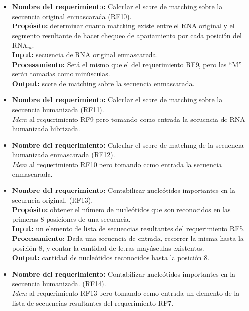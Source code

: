 \documentclass[12pt,a4paper,spanish]{article}
\begin{document}
\begin{itemize}
		\item \textbf{Nombre del requerimiento:} Calcular el score de matching sobre la secuencia original enmascarada 			(RF10).\\
 	    \textbf{Propósito:} determinar cuanto matching existe entre el RNA original y el segmento resultante de hacer 								chequeo de apariamiento por cada posición del RNA$_m$.\\
		\textbf{Input:} secuencia de RNA original enmascarada. \\
		\textbf{Procesamiento:} Será el mismo que el del requerimiento RF9, pero las ``M'' serán tomadas como 			 
        minúsculas.	\\
		\textbf{Output:} score de matching sobre la secuencia enmascarada.\\

		\item \textbf{Nombre del requerimiento:} Calcular el score de matching sobre la secuencia humanizada (RF11).\\
		\textit{Idem} al requerimiento RF9 pero tomando como entrada la secuencia de RNA humanizada hibrizada. \\

		\item \textbf{Nombre del requerimiento:} Calcular el score de matching de la secuencia humanizada enmascarada 			(RF12).\\
		\textit{Idem} al requerimiento RF10 pero tomando como entrada la secuencia enmascarada. \\	

		\item \textbf{Nombre del requerimiento:} Contabilizar nucleótidos importantes en la secuencia original. (RF13).\\
 	    \textbf{Propósito:} obtener el número de nucleótidos que son reconocidos en las primeras 8 posiciones de una 			secuencia.\\
		\textbf{Input:} un elemento de lista de secuencias resultantes del requerimiento RF5.\\
		\textbf{Procesamiento:} Dada una secuencia de entrada, recorrer la misma hasta la posición 8, y contar la 			cantidad de letras mayúsculas existentes.\\
		\textbf{Output:} cantidad de nucleótidos reconocidos hasta la posición 8. \\

		\item \textbf{Nombre del requerimiento:} Contabilizar nucleótidos importantes en la secuencia humanizada. (RF14).\\
		\textit{Idem} al requerimiento RF13 pero tomando como entrada un elemento de la lista de secuencias resultantes 		del requerimiento RF7. \\


\end{itemize}
\end{document}
